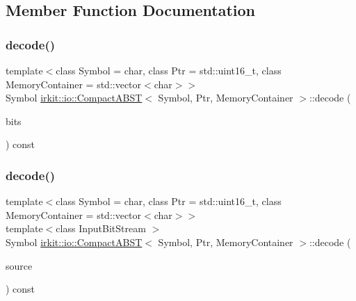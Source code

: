 \subsection{Member Function Documentation}
\mbox{\label{classirkit_1_1io_1_1CompactABST_a5f4fa49fc2cde124bb4f9a4017bd370c}} 
\subsubsection{\texorpdfstring{decode()}{decode()}\hspace{0.1cm}{\footnotesize\ttfamily [1/2]}}
{\footnotesize\ttfamily template$<$class Symbol = char, class Ptr = std\+::uint16\+\_\+t, class Memory\+Container = std\+::vector$<$char$>$$>$ \\
Symbol \mbox{\hyperlink{classirkit_1_1io_1_1CompactABST}{irkit\+::io\+::\+Compact\+A\+B\+ST}}$<$ Symbol, Ptr, Memory\+Container $>$\+::decode (\begin{DoxyParamCaption}\item[{const boost\+::dynamic\+\_\+bitset$<$ unsigned char $>$ \&}]{bits }\end{DoxyParamCaption}) const\hspace{0.3cm}{\ttfamily [inline]}}

\mbox{\label{classirkit_1_1io_1_1CompactABST_a30472a27b6d73f6c567533bdb0a747a5}} 
\subsubsection{\texorpdfstring{decode()}{decode()}\hspace{0.1cm}{\footnotesize\ttfamily [2/2]}}
{\footnotesize\ttfamily template$<$class Symbol = char, class Ptr = std\+::uint16\+\_\+t, class Memory\+Container = std\+::vector$<$char$>$$>$ \\
template$<$class Input\+Bit\+Stream $>$ \\
Symbol \mbox{\hyperlink{classirkit_1_1io_1_1CompactABST}{irkit\+::io\+::\+Compact\+A\+B\+ST}}$<$ Symbol, Ptr, Memory\+Container $>$\+::decode (\begin{DoxyParamCaption}\item[{\mbox{\hyperlink{classirkit_1_1io_1_1InputBitStream}{Input\+Bit\+Stream}} \&}]{source }\end{DoxyParamCaption}) const\hspace{0.3cm}{\ttfamily [inline]}}

